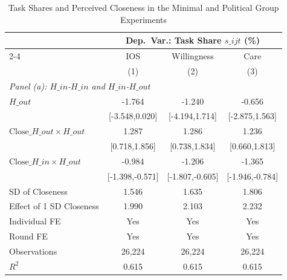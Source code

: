 \begin{table}[H]
\centering
\caption{Task Shares and Perceived Closeness in the Minimal and Political Group Experiments}
\footnotesize
\begin{threeparttable}
\begin{tabular}{l*{3}{c}}
\toprule\toprule
& \multicolumn{3}{c}{Dep.\ Var.: Task Share $s\_{ijt}$ (\%)} \\
\cmidrule(lr){2-4}
& IOS & Willingness & Care \\
& (1) & (2) & (3) \\
\midrule
\multicolumn{4}{l}{\textit{Panel (a): $H\_{in}$-$H\_{in}$ and $H\_{in}$-$H\_{out}$}} \\
\midrule
$H\_{out}$   &                -1.764         &                -1.240         &                -0.656         \\
            &        [-3.548,0.020]         &        [-4.194,1.714]         &        [-2.875,1.563]         \\
\addlinespace
$\text{Close}\_{H\_{out}} \times H\_{out}$&                 1.287\sym{***}&                 1.286\sym{***}&                 1.236\sym{***}\\
            &         [0.718,1.856]         &         [0.738,1.834]         &         [0.660,1.813]         \\
\addlinespace
$\text{Close}\_{H\_{in}} \times H\_{out}$&                -0.984\sym{***}&                -1.206\sym{***}&                -1.365\sym{***}\\
            &       [-1.398,-0.571]         &       [-1.807,-0.605]         &       [-1.946,-0.784]         \\
\midrule
SD of Closeness&                 1.546         &                 1.635         &                 1.806         \\
Effect of 1 SD Closeness&                 1.990         &                 2.103         &                 2.232         \\
Individual FE&                   Yes         &                   Yes         &                   Yes         \\
Round FE    &                   Yes         &                   Yes         &                   Yes         \\
Observations&                26,224         &                26,224         &                26,224         \\
\(R^2\)     &                 0.615         &                 0.615         &                 0.615         \\


\end{tabular}
\end{threeparttable}
\end{table}
